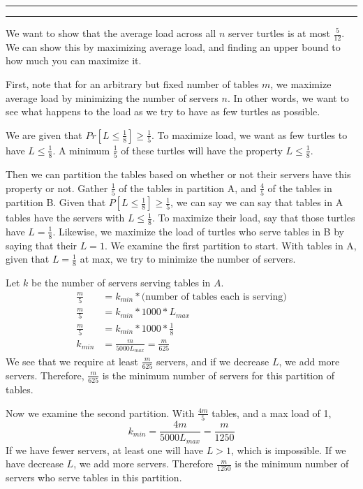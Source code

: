 \documentclass[11pt]{article}
\newcounter{questionCounter}
\newcounter{partCounter}[questionCounter]
\newenvironment{question}[2][\arabic{questionCounter}]{%
    \setcounter{partCounter}{0}%
    \vspace{.25in} \hrule \vspace{0.5em}%
        \noindent{\bf #2}%
    \vspace{0.8em} \hrule \vspace{.10in}%
    \addtocounter{questionCounter}{1}%
}{}
\begin{document}
\begin{question}{Time for Tea with Turtles}
We want to show that the average load across all $n$ server turtles is 
at most $\frac{5}{12}$. We can show this by maximizing average load,
and finding an upper bound to how much you can maximize it.

First, note that for an arbitrary but fixed number of tables $m$, we 
maximize average load by minimizing the number of servers $n$. In other
words, we want to see what happens to the load as we try to have as few
turtles as possible.

We are given that $Pr[L\leq \frac{1}{8}]\geq \frac{1}{5}$. To maximize load, we want as 
few turtles to have $L\leq \frac{1}{8}$. A minimum $\frac{1}{5}$ of these turtles 
will have the property $L \leq \frac{1}{8}$.

Then we can partition the tables based on whether or not their servers
have this property or not. Gather $\frac{1}{5}$ of the tables in partition A, and 
$\frac{4}{5}$ of the tables in
partition B. Given that $P[L\leq \frac{1}{8}]\geq \frac{1}{5}$, we can say we can say that 
tables in A tables have the servers with $L \leq \frac{1}{8}$. To maximize their
load, say that those turtles have $L=\frac{1}{8}$. Likewise, we maximize the load 
of turtles who serve tables in B by saying that their $L=1$. We examine the 
first partition to start. With tables in A, given that $L=\frac{1}{8}$ at max, we 
try to minimize the number of servers. 

Let $k$ be the number of servers serving tables in $A$.
\begin{align*}
\frac{m}{5} &= k_{min} *  \text{(number of tables each is serving)}\\
\frac{m}{5} &= k_{min} * 1000 * L_{max}\\
\frac{m}{5} &= k_{min} * 1000 * \frac{1}{8}\\
k_{min} &= \frac{m}{5000L_{max}} = \frac{m}{625}
\end{align*}
We see that we require at least $\frac{m}{625}$ servers, and if we decrease $L$, we add more servers.
Therefore, $\frac{m}{625}$ is the minimum number of servers for this partition of tables.

Now we examine the second partition. With $\frac{4m}{5}$ tables, and a max load of 1,
$$k_{min} = \frac{4m}{5000L_{max}} = \frac{m}{1250}$$
If we have fewer servers, at least one will have $L>1$, which is impossible.
If we have decrease $L$, we add more servers. Therefore $\frac{m}{1250}$
is the minimum number of servers who serve tables in this partition.


\end{question}
\end{document}
